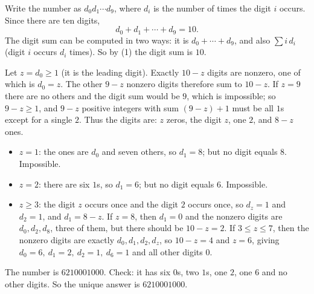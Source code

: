Write the number as $d_0d_1\cdots d_9$, where $d_i$ is the number of times the digit $i$ occurs. Since there are ten digits,
\[d_0+d_1+\cdots+d_9=10 .\tag{1}\]
The digit sum can be computed in two ways: it is $d_0+\cdots+d_9$, and also $\sum i\,d_i$ (digit $i$ occurs $d_i$ times). So by (1) the digit sum is $10$.

Let $z=d_0\ge1$ (it is the leading digit). Exactly $10-z$ digits are nonzero, one of which is $d_0=z$. The other $9-z$ nonzero digits therefore sum to $10-z$. If $z=9$ there are no others and the digit sum would be $9$, which is impossible; so $9-z\ge1$, and $9-z$ positive integers with sum $(9-z)+1$ must be all $1$s except for a single $2$. Thus the digits are: $z$ zeros, the digit $z$, one $2$, and $8-z$ ones.

\begin{itemize}
\item $z=1$: the ones are $d_0$ and seven others, so $d_1=8$; but no digit equals $8$. Impossible.
\item $z=2$: there are six $1$s, so $d_1=6$; but no digit equals $6$. Impossible.
\item $z\ge3$: the digit $z$ occurs once and the digit $2$ occurs once, so $d_z=1$ and $d_2=1$, and $d_1=8-z$. If $z=8$, then $d_1=0$ and the nonzero digits are $d_0,d_2,d_8$, three of them, but there should be $10-z=2$. If $3\le z\le7$, then the nonzero digits are exactly $d_0,d_1,d_2,d_z$, so $10-z=4$ and $z=6$, giving $d_0=6,\ d_1=2,\ d_2=1,\ d_6=1$ and all other digits $0$.
\end{itemize}
The number is $6210001000$. Check: it has six $0$s, two $1$s, one $2$, one $6$ and no other digits. So the unique answer is $\boxed{6210001000}$.
